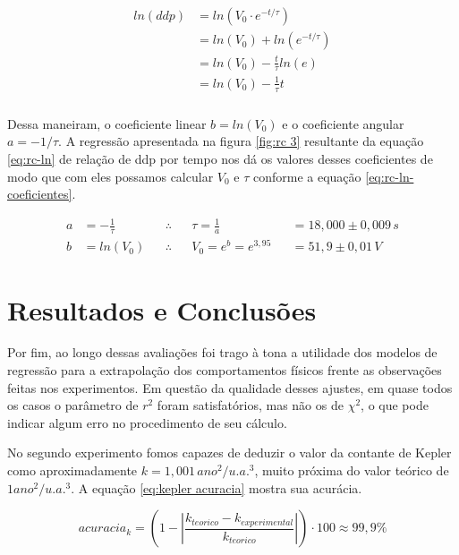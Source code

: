 \documentclass{article}
\begin{document}
\begin{align} \label{eq:rc-ln}
\begin{split}
    ln(ddp) &= ln(V_0 \cdot e^{-t/\tau}) \\
            &= ln(V_0) + ln(e^{-t/\tau}) \\
            &= ln(V_0) -\frac{t}{\tau} ln(e) \\
            &= ln(V_0) -\frac{1}{\tau} t \\
\end{split}
\end{align}

Dessa maneiram, o coeficiente linear $b = ln(V_0)$ e o coeficiente angular $a =
-1/\tau$. A regressão apresentada na figura \ref{fig:rc 3} resultante da equação
\eqref{eq:rc-ln} de relação de ddp por tempo nos dá os valores desses
coeficientes de modo que com eles possamos calcular $V_0$ e $\tau$ conforme a
equação \eqref{eq:rc-ln-coeficientes}.

\begin{align} \label{eq:rc-ln-coeficientes}
    a &= -\frac{1}{\tau} && \therefore &&\tau = \frac{1}{a} &&= 18,000 \pm 0,009
    \, s \\
    b &= ln(V_0) && \therefore &&V_0 = e^b = e^{3,95} &&= 51,9 \pm 0,01
    \, V
\end{align}

\section{Resultados e Conclusões}

Por fim, ao longo dessas avaliações foi trago à tona a utilidade dos modelos de
regressão para a extrapolação dos comportamentos físicos frente as observações
feitas nos experimentos. Em questão da qualidade desses ajustes, em quase todos
os casos o parâmetro de $r^2$ foram satisfatórios, mas não os de $\chi^2$, o que
pode indicar algum erro no procedimento de seu cálculo.

No segundo experimento fomos capazes de deduzir o valor da contante de Kepler como
aproximadamente $k = 1,001 \, ano^2/u.a.^3$, muito próxima do valor teórico de $1
ano^2/u.a.^3$. A equação \eqref{eq:kepler acuracia} mostra sua acurácia.

\begin{equation} \label{eq:kepler acuracia}
    acuracia_k = \left(1 - \left|\frac{k_{teorico} -
    k_{experimental}}{k_{teorico}}\right|\right) \cdot 100 \approx 99,9\%
\end{equation}
\end{document}
